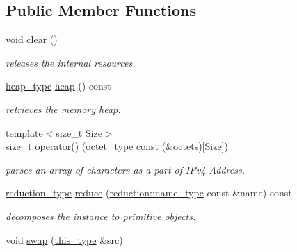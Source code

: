 \subsection*{Public Member Functions}
\begin{DoxyCompactItemize}
\item 
\hypertarget{classhryky_1_1parser_1_1_base_a135bce05655e290c78fa83196199a576}{void \hyperlink{classhryky_1_1parser_1_1_base_a135bce05655e290c78fa83196199a576}{clear} ()}\label{classhryky_1_1parser_1_1_base_a135bce05655e290c78fa83196199a576}

\begin{DoxyCompactList}\small\item\em releases the internal resources. \end{DoxyCompactList}\item 
\hypertarget{classhryky_1_1parser_1_1_base_ade0723cedb648d9850423cc04fe4bdcf}{\hyperlink{classhryky_1_1memory_1_1heap_1_1_base}{heap\-\_\-type} \hyperlink{classhryky_1_1parser_1_1_base_ade0723cedb648d9850423cc04fe4bdcf}{heap} () const}\label{classhryky_1_1parser_1_1_base_ade0723cedb648d9850423cc04fe4bdcf}

\begin{DoxyCompactList}\small\item\em retrieves the memory heap. \end{DoxyCompactList}\item 
{\footnotesize template$<$size\-\_\-t Size$>$ }\\size\-\_\-t \hyperlink{classhryky_1_1ip_1_1v4_1_1_parser_a95e8f941786866793f1947c4423ccab4}{operator()} (\hyperlink{namespacehryky_a488cba8b666be33ccca70e819684e3c8}{octet\-\_\-type} const (\&octets)\mbox{[}Size\mbox{]})
\begin{DoxyCompactList}\small\item\em parses an array of characters as a part of I\-Pv4 Address. \end{DoxyCompactList}\item 
\hypertarget{classhryky_1_1parser_1_1_base_a2809ad5f75abd2266e6804e90094bc05}{\hyperlink{namespacehryky_a343a9a4c36a586be5c2693156200eadc}{reduction\-\_\-type} \hyperlink{classhryky_1_1parser_1_1_base_a2809ad5f75abd2266e6804e90094bc05}{reduce} (\hyperlink{namespacehryky_1_1reduction_ac686c30a4c8d196bbd0f05629a6b921f}{reduction\-::name\-\_\-type} const \&name) const}\label{classhryky_1_1parser_1_1_base_a2809ad5f75abd2266e6804e90094bc05}

\begin{DoxyCompactList}\small\item\em decomposes the instance to primitive objects. \end{DoxyCompactList}\item 
\hypertarget{classhryky_1_1parser_1_1_base_ab2b137d16fbe40d839ee136bd5304cab}{void \hyperlink{classhryky_1_1parser_1_1_base_ab2b137d16fbe40d839ee136bd5304cab}{swap} (\hyperlink{classhryky_1_1ip_1_1v4_1_1_parser_ab85551348aa8cf5c7da65859d0d0448f}{this\-\_\-type} \&src)}\label{classhryky_1_1parser_1_1_base_ab2b137d16fbe40d839ee136bd5304cab}


\end{DoxyCompactItemize}
